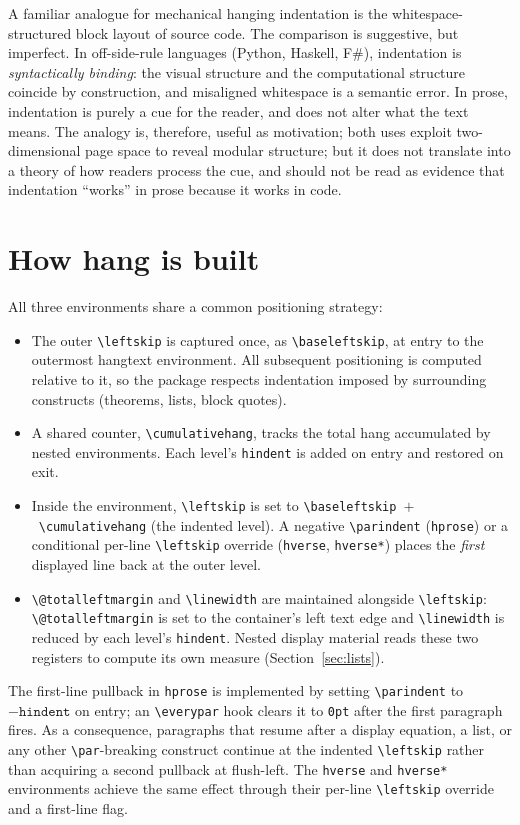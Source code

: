 \documentclass[11pt, twoside, openany]{article}
\newcommand{\pkg}[1]{\textsf{#1}}
\newcommand{\opt}[1]{\texttt{#1}}
\newcommand{\env}[1]{\texttt{#1}}
\newcommand{\cs}[1]{\texttt{\textbackslash #1}}
\begin{document}
A familiar analogue for mechanical hanging indentation is the whitespace-structured block layout of source code. The comparison is suggestive, but imperfect. In off-side-rule languages (Python, Haskell, F\#), indentation is \emph{syntactically binding}: the visual structure and the computational structure coincide by construction, and misaligned whitespace is a semantic error. In prose, indentation is purely a cue for the reader, and does not alter what the text means. The analogy is, therefore, useful as motivation; both uses exploit two-dimensional page space to reveal modular structure; but it does not translate into a theory of how readers process the cue, and should not be read as evidence that indentation ``works'' in prose because it works in code.

\section{How hang is built}\label{sec:semantics}

All three environments share a common positioning strategy:

\begin{itemize}
  \item The outer \cs{leftskip} is captured once, as \cs{baseleftskip}, at entry to the outermost \pkg{hangtext} environment. All subsequent positioning is computed relative to it, so the package respects indentation imposed by surrounding constructs (theorems, lists, block quotes).
  \item A shared counter, \cs{cumulativehang}, tracks the total hang accumulated by nested environments. Each level's \opt{hindent} is added on entry and restored on exit.
  \item Inside the environment, \cs{leftskip} is set to \cs{baseleftskip}~$+$~\cs{cumulativehang} (the indented level). A negative \cs{parindent} (\env{hprose}) or a conditional per-line \cs{leftskip} override (\env{hverse}, \env{hverse*}) places the \emph{first} displayed line back at the outer level.
  \item \cs{@totalleftmargin} and \cs{linewidth} are maintained alongside \cs{leftskip}: \cs{@totalleftmargin} is set to the container's left text edge and \cs{linewidth} is reduced by each level's \opt{hindent}. Nested display material reads these two registers to compute its own measure (Section~\ref{sec:lists}).
\end{itemize}

The first-line pullback in \env{hprose} is implemented by setting \cs{parindent} to $-\opt{hindent}$ on entry; an \cs{everypar} hook clears it to \texttt{0pt} after the first paragraph fires. As a consequence, paragraphs that resume after a display equation, a list, or any other \cs{par}-breaking construct continue at the indented \cs{leftskip} rather than acquiring a second pullback at flush-left. The \env{hverse} and \env{hverse*} environments achieve the same effect through their per-line \cs{leftskip} override and a first-line flag.
\end{document}
